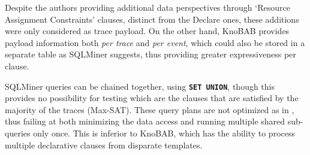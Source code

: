{Despite the authors} providing additional {data} perspectives through `Resource Assignment Constraints' clauses, distinct from the Declare ones, these additions were only considered  {as trace payload}. On the other hand, KnoBAB provides payload information {both \emph{per trace}} and \emph{per event}, which could also be stored in a separate table as SQLMiner suggests, thus providing greater expressiveness per clause.

SQLMiner queries can be chained together, using \texttt{\textbf{SET UNION}}, though this provides no possibility for testing which are the clauses that are satisfied by the majority of the traces (Max-SAT). These query plans are not optimized as in \cite{BellatrecheKB21}, thus failing at both minimizing the data access
and running multiple shared sub-queries only once.
This is inferior to KnoBAB, which has the ability to process multiple 
declarative clauses from disparate templates. %
